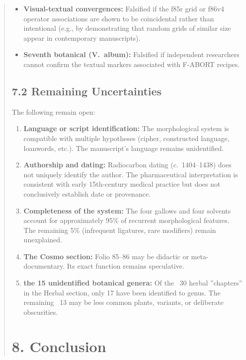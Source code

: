 \documentclass[11pt,a4paper]{article}
\begin{document}
\begin{abstract}
\begin{itemize}
\item \textbf{Visual-textual convergences:} Falsified if the f85r grid or f86v4 operator associations are shown to be coincidental rather than intentional (e.g., by demonstrating that random grids of similar size appear in contemporary manuscripts).
  
\item \textbf{Seventh botanical (V.\ album):} Falsified if independent researchers cannot confirm the textual markers associated with F-ABORT recipes.
\end{itemize}

\subsection*{7.2 Remaining Uncertainties}

The following remain open:

\begin{enumerate}
\item \textbf{Language or script identification:} The morphological system is compatible with multiple hypotheses (cipher, constructed language, loanwords, etc.). The manuscript's language remains unidentified.
  
\item \textbf{Authorship and dating:} Radiocarbon dating (c.\ 1404--1438) does not uniquely identify the author. The pharmaceutical interpretation is consistent with early 15th-century medical practice but does not conclusively establish date or provenance.
  
\item \textbf{Completeness of the system:} The four gallows and four solvents account for approximately 95\% of recurrent morphological features. The remaining 5\% (infrequent ligatures, rare modifiers) remain unexplained.
  
\item \textbf{The Cosmo section:} Folio 85--86 may be didactic or meta-documentary. Its exact function remains speculative.
  
\item \textbf{the 15 unidentified botanical genera:} Of the ~30 herbal ''chapters'' in the Herbal section, only 17 have been identified to genus. The remaining ~13 may be less common plants, variants, or deliberate obscurities.
\end{enumerate}

\section*{8. Conclusion}


\end{abstract}
\end{document}
